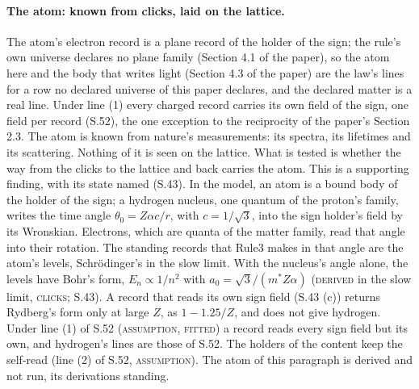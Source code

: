 \documentclass[pdflatex,sn-mathphys-num]{sn-jnl}
\newcommand{\claimmark}[1]{\textup{\textsc{#1}}}
\newcommand{\fence}[1]{\textup{\textsc{#1}}}
\theoremstyle{thmstyleone}
\begin{document}
\paragraph{The atom: known from clicks, laid on the lattice.} The atom's electron record is a plane record of the holder of the sign; the rule's own universe declares no plane family (Section 4.1 of the paper), so the atom here and the body that writes light (Section 4.3 of the paper) are the law's lines for a row no declared universe of this paper declares, and the declared matter is a real line. Under line (1) every charged record carries its own field of the sign, one field per record (S.52), the one exception to the reciprocity of the paper's Section 2.3. The atom is known from nature's measurements: its spectra, its lifetimes and its scattering. Nothing of it is seen on the lattice. What is tested is whether the way from the clicks to the lattice and back carries the atom. This is a supporting finding, with its state named (S.43). In the model, an atom is a bound body of the holder of the sign; a hydrogen nucleus, one quantum of the proton's family, writes the time angle $\theta_0 = Z\alpha c / r$, with $c = 1 / \sqrt 3$, into the sign holder's field by its Wronskian. Electrons, which are quanta of the matter family, read that angle into their rotation. The standing records that Rule3 makes in that angle are the atom's levels, Schr\"odinger's in the slow limit. With the nucleus's angle alone, the levels have Bohr's form, $E_n \propto 1 / n^2$ with $a_0 = \sqrt 3 / (m^* Z\alpha)$ (\claimmark{derived} in the slow limit, \fence{clicks}; S.43). A record that reads its own sign field (S.43 (c)) returns Rydberg's form only at large $Z$, as $1 - 1.25 / Z$, and does not give hydrogen. Under line (1) of S.52 (\claimmark{assumption}, \claimmark{fitted}) a record reads every sign field but its own, and hydrogen's lines are those of S.52. The holders of the content keep the self-read (line (2) of S.52, \claimmark{assumption}). The atom of this paragraph is derived and not run, its derivations standing.
\end{document}
